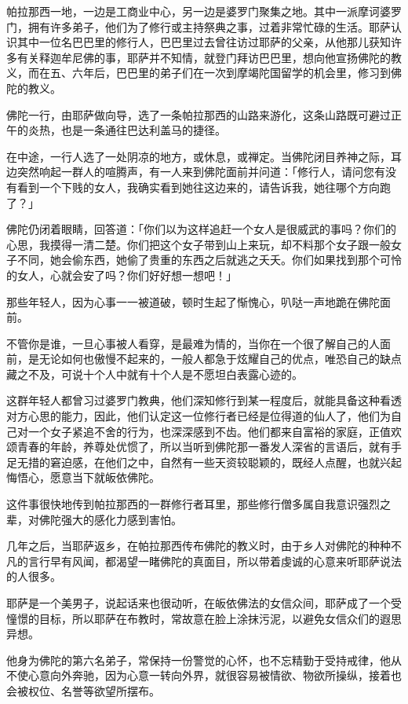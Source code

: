 \documentclass[12pt,twoside,openany]{book}
\begin{document}
帕拉那西一地，一边是工商业中心，另一边是婆罗门聚集之地。其中一派摩诃婆罗门，拥有许多弟子，他们为了修行或主持祭典之事，过着非常忙碌的生活。耶萨认识其中一位名巴巴里的修行人，巴巴里过去曾往访过耶萨的父亲，从他那儿获知许多有关释迦牟尼佛的事，耶萨并不知情，就登门拜访巴巴里，想向他宣扬佛陀的教义，而在五、六年后，巴巴里的弟子们在一次到摩竭陀国留学的机会里，修习到佛陀的教义。

佛陀一行，由耶萨做向导，选了一条帕拉那西的山路来游化，这条山路既可避过正午的炎热，也是一条通往巴达利盖马的捷径。

在中途，一行人选了一处阴凉的地方，或休息，或禅定。当佛陀闭目养神之际，耳边突然响起一群人的喧腾声，有一人来到佛陀面前并问道：「修行人，请问您有没有看到一个下贱的女人，我确实看到她往这边来的，请告诉我，她往哪个方向跑了？」

佛陀仍闭着眼睛，回答道：「你们以为这样追赶一个女人是很威武的事吗？你们的心思，我摸得一清二楚。你们把这个女子带到山上来玩，却不料那个女子跟一般女子不同，她会偷东西，她偷了贵重的东西之后就逃之夭夭。你们如果找到那个可怜的女人，心就会安了吗？你们好好想一想吧！」

那些年轻人，因为心事一一被道破，顿时生起了惭愧心，叭哒一声地跪在佛陀面前。

不管你是谁，一旦心事被人看穿，是最难为情的，当你在一个很了解自己的人面前，是无论如何也傲慢不起来的，一般人都急于炫耀自己的优点，唯恐自己的缺点藏之不及，可说十个人中就有十个人是不愿坦白表露心迹的。

这群年轻人都曾习过婆罗门教典，他们深知修行到某一程度后，就能具备这种看透对方心思的能力，因此，他们认定这一位修行者已经是位得道的仙人了，他们为自己对一个女子紧追不舍的行为，也深深感到不齿。他们都来自富裕的家庭，正值欢颂青春的年龄，养尊处优惯了，所以当听到佛陀那一番发人深省的言语后，就有手足无措的窘迫感，在他们之中，自然有一些天资较聪颖的，既经人点醒，也就兴起悔悟心，愿意当下就皈依佛陀。

这件事很快地传到帕拉那西的一群修行者耳里，那些修行僧多属自我意识强烈之辈，对佛陀强大的感化力感到害怕。

几年之后，当耶萨返乡，在帕拉那西传布佛陀的教义时，由于乡人对佛陀的种种不凡的言行早有风闻，都渴望一睹佛陀的真面目，所以带着虔诚的心意来听耶萨说法的人很多。

耶萨是一个美男子，说起话来也很动听，在皈依佛法的女信众间，耶萨成了一个受憧憬的目标，所以耶萨在布教时，常故意在脸上涂抹污泥，以避免女信众们的遐思异想。

他身为佛陀的第六名弟子，常保持一份警觉的心怀，也不忘精勤于受持戒律，他从不使心意向外奔驰，因为心意一转向外界，就很容易被情欲、物欲所操纵，接着也会被权位、名誉等欲望所摆布。
\end{document}
